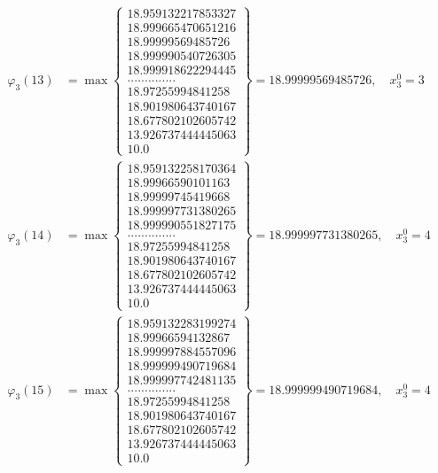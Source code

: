 \documentclass{article}
\begin{document}
\begin{align*}
  
  
  
\varphi_{3}(13) &= \max \left\{ \begin{array}{c}
18.959132217853327 \\
 18.999665470651216 \\
 18.99999569485726 \\
 18.999990540726305 \\
 18.999918622294445 \\
 .............. \\
 18.97255994841258 \\
 18.901980643740167 \\
 18.677802102605742 \\
 13.926737444445063 \\
 10.0
\end{array} \right\} = 18.99999569485726, \quad x_{3}^0 = 3\\
  
  
  
  
\varphi_{3}(14) &= \max \left\{ \begin{array}{c}
18.959132258170364 \\
 18.99966590101163 \\
 18.99999745419668 \\
 18.999997731380265 \\
 18.999990551827175 \\
 .............. \\
 18.97255994841258 \\
 18.901980643740167 \\
 18.677802102605742 \\
 13.926737444445063 \\
 10.0
\end{array} \right\} = 18.999997731380265, \quad x_{3}^0 = 4\\
  
  
  
  
\varphi_{3}(15) &= \max \left\{ \begin{array}{c}
18.959132283199274 \\
 18.99966594132867 \\
 18.999997884557096 \\
 18.999999490719684 \\
 18.999997742481135 \\
 .............. \\
 18.97255994841258 \\
 18.901980643740167 \\
 18.677802102605742 \\
 13.926737444445063 \\
 10.0
\end{array} \right\} = 18.999999490719684, \quad x_{3}^0 = 4\\
  

\end{align*}
\end{document}
